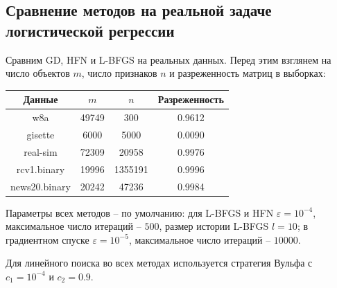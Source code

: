 \documentclass[11pt]{article}
\begin{document}
\subsection{Сравнение методов на реальной задаче логистической регрессии}


\hspace{1cm} Сравним GD, HFN и L-BFGS на реальных данных. Перед этим
взглянем на число объектов $m$, число признаков $n$ и разреженность матриц в выборках:
\begin{center}
\begin{tabular}{|c|c|c|c|} 
 \hline
 Данные & $m$ & $n$ & Разреженность\\ [0.5ex] 
 \hline\hline
 w8a & 49749 & 300 & 0.9612\\ 
 \hline
 gisette & 6000 & 5000 & 0.0090\\ 
 \hline
 real-sim & 72309 & 20958 & 0.9976\\ 
 \hline
 rcv1.binary & 19996 & 1355191 & 0.9996\\ 
 \hline
 news20.binary & 20242 & 47236 & 0.9984\\ 
 \hline
\end{tabular}
\end{center}

Параметры всех методов -- по умолчанию:
для L-BFGS и HFN $\varepsilon=10^{-4}$, максимальное число итераций -- $500$, размер истории L-BFGS $l=10$;
в градиентном спуске $\varepsilon=10^{-5}$, максимальное число итераций -- $10000$.

Для линейного поиска во всех методах используется стратегия Вульфа с $c_1=10^{-4}$ и $c_2=0.9$.
\end{document}
